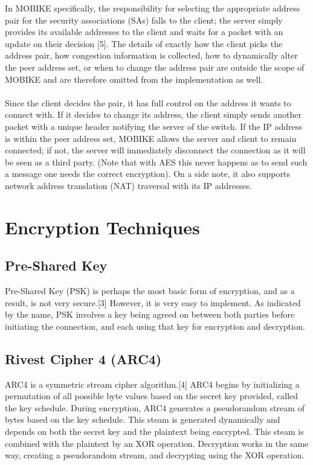 \documentclass[runningheads]{llncs}
\begin{document}
In MOBIKE specifically, the responsibility for selecting the appropriate address pair for the security associations (SAs) falls to the client; the server simply provides its available addresses to the client and waits for a packet with an update on their decision [5]. The details of exactly how the client picks the address pair, how congestion information is collected, how to dynamically alter the peer address set, or when to change the address pair are outside the scope of MOBIKE and are therefore omitted from the implementation as well.\\
\\
Since the client decides the pair, it has full control on the address it wants to connect with. If it decides to change its address, the client simply sends another packet with a unique header notifying the server of the switch. If the IP address is within the peer address set, MOBIKE allows the server and client to remain connected; if not, the server will immediately disconnect the connection as it will be seen as a third party. (Note that with AES this never happens as to send such a message one needs the correct encryption). On a side note, it also supports network address translation (NAT) traversal with its IP addresses.
\section{Encryption Techniques}
\subsection{Pre-Shared Key}
Pre-Shared Key (PSK) is perhaps the most basic form of encryption, and as a result, is not very secure.[3] However, it is very easy to implement. As indicated by the name, PSK involves a key being agreed on between both parties before initiating the connection, and each using that key for encryption and decryption.
\subsection{Rivest Cipher 4 (ARC4)}
ARC4 is a symmetric stream cipher algorithm.[4] ARC4 begins by initializing a permutation of all possible byte values based on the secret key provided, called the key schedule. During encryption, ARC4 generates a pseudorandom stream of bytes based on the key schedule. This steam is generated dynamically and depends on both the secret key and the plaintext being encrypted. This steam is combined with the plaintext by an XOR operation. Decryption works in the same way, creating a pseudorandom stream, and decrypting using the XOR operation.
\end{document}
